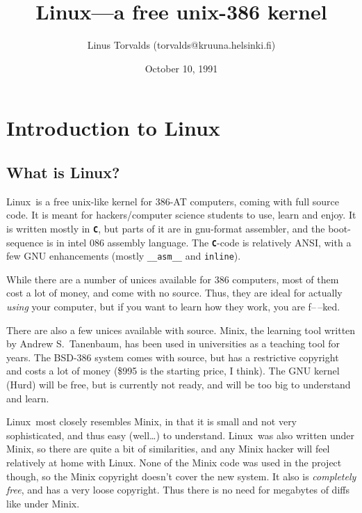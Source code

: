 %
%
%

\def\nic{{\tt `nic.funet.fi'}}
\def\dir{{\tt '/pub/OS/Linux'}}
\def\ftp{{\tt ftp}}
\def\Linux{\begingroup\sc Linux\endgroup}

\title{\Linux---a free unix-386 kernel}
\author{Linus Torvalds (torvalds@kruuna.helsinki.fi)}
\date{October 10, 1991}

\maketitle

\section{Introduction to \Linux}

\subsection{What is \Linux?}

\Linux\ is a free unix-like kernel for 386-AT computers, coming with
full source code. It is meant for hackers/computer science students to
use, learn and enjoy. It is written mostly in {\tt\bf C}, but parts of
it are in gnu-format assembler, and the boot-sequence is in intel 086
assembly language. The {\tt\bf C}-code is relatively ANSI, with a few
GNU enhancements (mostly {\tt\_\_asm\_\_} and {\tt inline}).

While there are a number of unices available for 386 computers, most of
them cost a lot of money, and come with no source. Thus, they are ideal
for actually {\it using} your computer, but if you want to learn how
they work, you are f--\,--ked.

There are also a few unices available with source. Minix, the learning
tool written by Andrew S.~Tanenbaum, has been used in universities as a
teaching tool for years. The BSD-386 system comes with source, but has a
restrictive copyright and costs a lot of money (\$995 is the starting
price, I think). The GNU kernel (Hurd) will be free, but is currently
not ready, and will be too big to understand and learn.

\Linux\ most closely resembles Minix, in that it is small and not very
sophisticated, and thus easy (well\dots) to understand.  \Linux\ was
also written under Minix, so there are quite a bit of similarities, and
any Minix hacker will feel relatively at home with \Linux.  None of the
Minix code was used in the project though, so the Minix copyright
doesn't cover the new system.  It also is {\it completely free}, and has
a very loose copyright.  Thus there is no need for megabytes of diffs
like under Minix. 


